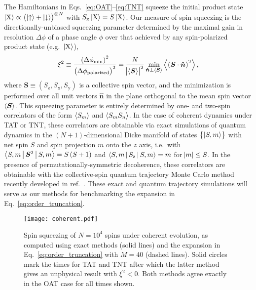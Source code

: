 \documentclass[pra,reprint,longbibliography]{revtex4-1}
\renewcommand{\t}{\text} %
\newcommand{\f}[2]{\dfrac{#1}{#2}} %
\newcommand{\p}[1]{\left(#1\right)} %
\renewcommand{\set}[1]{\left\{#1\right\}} %
\renewcommand{\v}{\bm} %
\newcommand{\uv}[1]{\v{\hat{#1}}} %
\renewcommand{\c}{\cdot} %
\newcommand{\bk}{\Braket} %
\newcommand{\z}{\text{z}}
\newcommand{\x}{\text{x}}
\newcommand{\y}{\text{y}}
\newcommand{\X}{\text{X}}
\newcommand{\1}{\mathds{1}}
\newcommand{\up}{\uparrow}
\newcommand{\dn}{\downarrow}
\begin{document}
The Hamiltonians in Eqs.~\eqref{eq:OAT}--\eqref{eq:TNT} squeeze the
initial product state $\ket{\X}\propto\p{\ket\up+\ket\dn}^{\otimes N}$
with $S_\x\ket{\X}=S\ket{\X}$.  Our measure of spin squeezing is the
directionally-unbiased squeezing parameter determined by the maximal
gain in resolution $\Delta\phi$ of a phase angle $\phi$ over that
achieved by any spin-polarized product state
(e.g.~$\ket{\X}$)\cite{wineland1992spin, ma2011quantum},
\begin{align}
  \xi^2
  \equiv \f{\p{\Delta\phi_{\t{min}}}^2}{\p{\Delta\phi_{\t{polarized}}}^2}
  = \f{N}{\abs{\bk{\v S}}^2}
  \min_{\uv n\perp\bk{\v S}} \bk{\p{\v S\c\uv n}^2},
  \label{eq:squeezing}
\end{align}
where $\v S\equiv\p{S_\z,S_\x,S_\y}$ is a collective spin vector, and
the minimization is performed over all unit vectors $\uv n$ in the
plane orthogonal to the mean spin vector $\bk{\v S}$.  This squeezing
parameter is entirely determined by one- and two-spin correlators of
the form $\bk{S_m}$ and $\bk{S_m S_n}$.  In the case of coherent
dynamics under TAT or TNT, these correlators are obtainable via exact
simulations of quantum dynamics in the $\p{N+1}$-dimensional Dicke
manifold of states $\set{\ket{S,m}}$ with net spin $S$ and spin
projection $m$ onto the $z$ axis, i.e.~with
$\bk{S,m|\v S^2|S,m}=S\p{S+1}$ and $\bk{S,m|S_\z|S,m}=m$ for
$\abs{m}\le S$.  In the presence of permutationally-symmetric
decoherence, these correlators are obtainable with the collective-spin
quantum trajectory Monte Carlo method recently developed in
ref.~\cite{zhang2018montecarlo}.  These exact and quantum trajectory
simulations will serve as our methods for benchmarking the expansion
in Eq.~\eqref{eq:order_truncation}.

\begin{figure}
  \centering
  \texttt{[image: coherent.pdf]}
  \caption{Spin squeezing of $N=10^4$ spins under coherent evolution,
    as computed using exact methods (solid lines) and the expansion in
    Eq.~\eqref{eq:order_truncation} with $M=40$ (dashed lines).  Solid
    circles mark the times for TAT and TNT after which the latter
    method gives an unphysical result with $\xi^2<0$.  Both methods
    agree exactly in the OAT case for all times shown.}
  \label{fig:coherent}
\end{figure}
\end{document}
